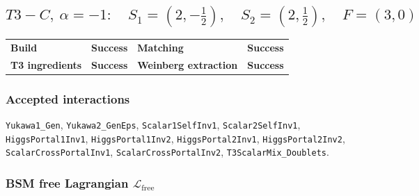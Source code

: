 \documentclass[10pt]{article}
\begin{document}
\subsection*{$T3-C,\ \alpha=-1:\quad S_1=(2,-\frac{1}{2}),\quad S_2=(2,\frac{1}{2}),\quad F=(3,0)$}
\begin{center}
\begin{tabular}{>{\bfseries}l l >{\bfseries}l l}
\toprule
Build & \textbf{Success} & Matching & \textbf{Success} \\
T3 ingredients & \textbf{Success} & Weinberg extraction & \textbf{Success} \\
\bottomrule
\end{tabular}
\end{center}
\subsubsection*{Accepted interactions}
\texttt{Yukawa1\_Gen}, \texttt{Yukawa2\_GenEps}, \texttt{Scalar1SelfInv1}, \texttt{Scalar2SelfInv1}, \texttt{HiggsPortal1Inv1}, \texttt{HiggsPortal1Inv2}, \texttt{HiggsPortal2Inv1}, \texttt{HiggsPortal2Inv2}, \texttt{ScalarCrossPortalInv1}, \texttt{ScalarCrossPortalInv2}, \texttt{T3ScalarMix\_Doublets}.
\subsubsection*{BSM free Lagrangian $\mathcal{L}_{\mathrm{free}}$}
\noindent{}\par
\smallskip
\noindent{}\par
\smallskip
\noindent{}\par
\smallskip
\noindent{}\par
\smallskip
\noindent{}\par
\smallskip
\noindent{}\par
\smallskip
\end{document}
